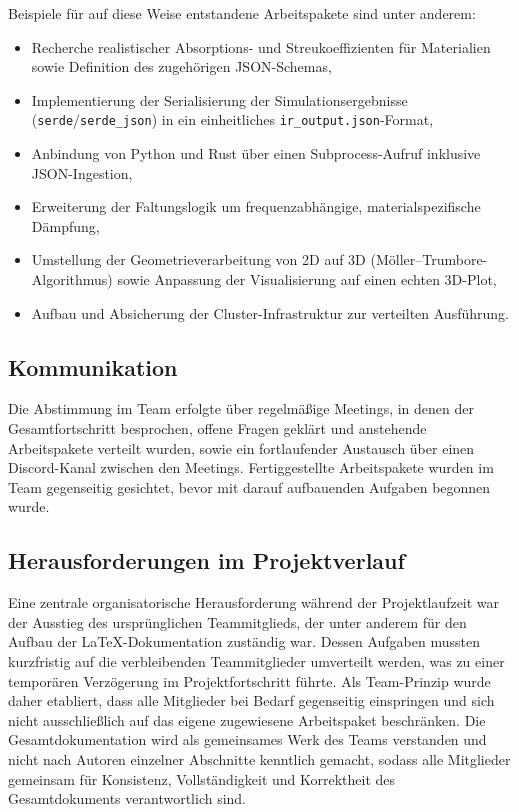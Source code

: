 \documentclass{article}
\begin{document}
Beispiele für auf diese Weise entstandene Arbeitspakete sind unter
anderem:
\begin{itemize}
 \item Recherche realistischer Absorptions- und Streukoeffizienten für
 Materialien sowie Definition des zugehörigen JSON-Schemas,
 \item Implementierung der Serialisierung der Simulationsergebnisse
 (\texttt{serde}/\texttt{serde\_json}) in ein einheitliches
 \texttt{ir\_output.json}-Format,
 \item Anbindung von Python und Rust über einen Subprocess-Aufruf
 inklusive JSON-Ingestion,
 \item Erweiterung der Faltungslogik um frequenzabhängige,
 materialspezifische Dämpfung,
 \item Umstellung der Geometrieverarbeitung von 2D auf 3D
 (Möller--Trumbore-Algorithmus) sowie Anpassung der Visualisierung
 auf einen echten 3D-Plot,
 \item Aufbau und Absicherung der Cluster-Infrastruktur zur verteilten
 Ausführung.
\end{itemize}

\subsection{Kommunikation}
\label{sec:kommunikation}
Die Abstimmung im Team erfolgte über regelmäßige
Meetings, in denen der Gesamtfortschritt besprochen, offene Fragen
geklärt und anstehende Arbeitspakete verteilt wurden, sowie ein
fortlaufender Austausch über einen Discord-Kanal zwischen den Meetings.
Fertiggestellte Arbeitspakete wurden im Team gegenseitig gesichtet, bevor
mit darauf aufbauenden Aufgaben begonnen wurde.

\subsection{Herausforderungen im Projektverlauf}
\label{sec:herausforderungen-orga}
Eine zentrale organisatorische Herausforderung während der
Projektlaufzeit war der Ausstieg des ursprünglichen Teammitglieds, der unter
anderem für den Aufbau der LaTeX-Dokumentation zuständig war. Dessen Aufgaben mussten 
kurzfristig auf die verbleibenden Teammitglieder umverteilt werden, was zu einer temporären 
Verzögerung im Projektfortschritt führte. Als Team-Prinzip
wurde daher etabliert, dass alle Mitglieder bei Bedarf gegenseitig
einspringen und sich nicht ausschließlich auf das eigene zugewiesene
Arbeitspaket beschränken. Die Gesamtdokumentation wird
als gemeinsames Werk des Teams verstanden und nicht nach Autoren
einzelner Abschnitte kenntlich gemacht, sodass alle Mitglieder gemeinsam
für Konsistenz, Vollständigkeit und Korrektheit des Gesamtdokuments
verantwortlich sind.
\end{document}
